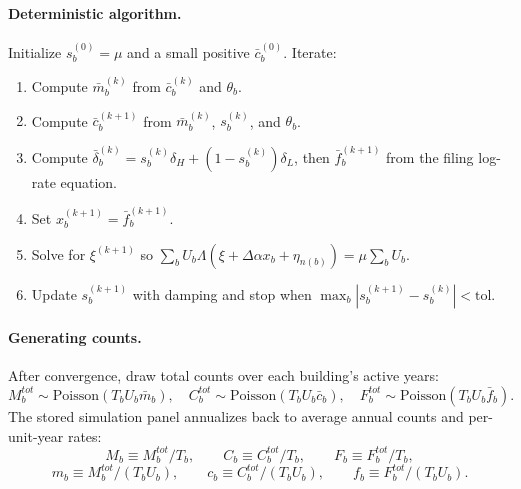 \documentclass[11pt]{article}
\begin{document}
\paragraph{Deterministic algorithm.}
Initialize $s_b^{(0)}=\mu$ and a small positive $\bar c_b^{(0)}$. Iterate:
\begin{enumerate}
  \item Compute $\bar m_b^{(k)}$ from $\bar c_b^{(k)}$ and $\theta_b$.
  \item Compute $\bar c_b^{(k+1)}$ from $\bar m_b^{(k)}$, $s_b^{(k)}$, and $\theta_b$.
  \item Compute $\bar\delta_b^{(k)} = s_b^{(k)}\delta_H + (1-s_b^{(k)})\delta_L$, then $\bar f_b^{(k+1)}$ from the filing log-rate equation.
  \item Set $x_b^{(k+1)}=\bar f_b^{(k+1)}$.
  \item Solve for $\xi^{(k+1)}$ so $\sum_b U_b \Lambda(\xi+\Delta\alpha x_b+\eta_{n(b)})=\mu\sum_b U_b$.
  \item Update $s_b^{(k+1)}$ with damping and stop when $\max_b|s_b^{(k+1)}-s_b^{(k)}|<\text{tol}$.
\end{enumerate}

\paragraph{Generating counts.}
After convergence, draw total counts over each building's active years:
\[
M_b^{tot}\sim \text{Poisson}(T_bU_b\bar m_b),\quad
C_b^{tot}\sim \text{Poisson}(T_bU_b\bar c_b),
\quad
F_b^{tot}\sim \text{Poisson}(T_bU_b\bar f_b).
\]
The stored simulation panel annualizes back to average annual counts and per-unit-year rates:
\[
M_b \equiv M_b^{tot}/T_b,\qquad
C_b \equiv C_b^{tot}/T_b,\qquad
F_b \equiv F_b^{tot}/T_b,
\]
\[
m_b \equiv M_b^{tot}/(T_bU_b),\qquad
c_b \equiv C_b^{tot}/(T_bU_b),\qquad
f_b \equiv F_b^{tot}/(T_bU_b).
\]
\end{document}
